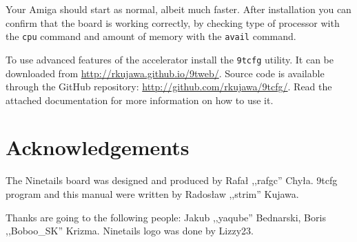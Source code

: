 \documentclass[10pt,a5paper]{article}
\begin{document}
Your Amiga should start as normal, albeit much faster. After installation you can confirm that the board is working correctly, by checking type of processor with the {\tt cpu} command and amount of memory with the {\tt avail} command.

To use advanced features of the accelerator install the {\tt 9tcfg} utility. It can be downloaded from \url{http://rkujawa.github.io/9tweb/}. Source code is available through the GitHub repository: \url{http://github.com/rkujawa/9tcfg/}. Read the attached documentation for more information on how to use it. 

\section*{Acknowledgements}

The Ninetails board was designed and produced by Rafał ,,rafgc'' Chyła. 9tcfg program and this manual were written by Radosław ,,strim'' Kujawa.

Thanks are going to the following people: Jakub ,,yaqube'' Bednarski, Boris ,,Boboo\_SK'' Krizma. Ninetails logo was done by Lizzy23.
\end{document}
